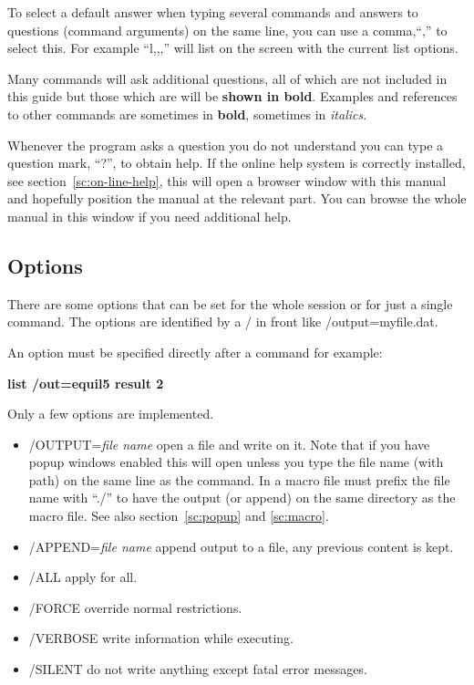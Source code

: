 \documentclass[11pt]{article}
\begin{document}
To select a default answer when typing several commands and answers to
questions (command arguments) on the same line, you can use a
comma,``,'' to select this.  For example ``l,,,'' will list on the
screen with the current list options.

Many commands will ask additional questions, all of which are not
included in this guide but those which are will be {\bf shown in
  bold}.  Examples and references to other commands are sometimes in
{\bf bold}, sometimes in {\em italics}.

Whenever the program asks a question you do not understand you can
type a question mark, ``?'', to obtain help.  If the online help
system is correctly installed, see section~\ref{sc:on-line-help}, this
will open a browser window with this manual and hopefully position the
manual at the relevant part.  You can browse the whole manual in this
window if you need additional help.

\hypertarget{Command options}{}
\subsection{Options}\label{sc:options}

There are some options that can be set for the whole session or for just a
single command.  The options are identified by a / in front like
/output=myfile.dat.

An option must be specified directly after a command for example:

{\bf list /out=equil5 result 2}

Only a few options are implemented.

\begin{itemize}
\item /OUTPUT={\em file name} open a file and write on it.  Note that
  if you have popup windows enabled this will open unless you type the
  file name (with path) on the same line as the command.  In a macro
  file must prefix the file name with ``./'' to have the output (or
  append) on the same directory as the macro file.  See also
  section~\ref{sc:popup} and \ref{sc:macro}.
\item /APPEND={\em file name} append output to a file, any previous
  content is kept.
\item /ALL apply for all.
\item /FORCE override normal restrictions.
\item /VERBOSE write information while executing.
\item /SILENT do not write anything except fatal error messages.
\end{itemize}
\hypertarget{About}{}
\end{document}

